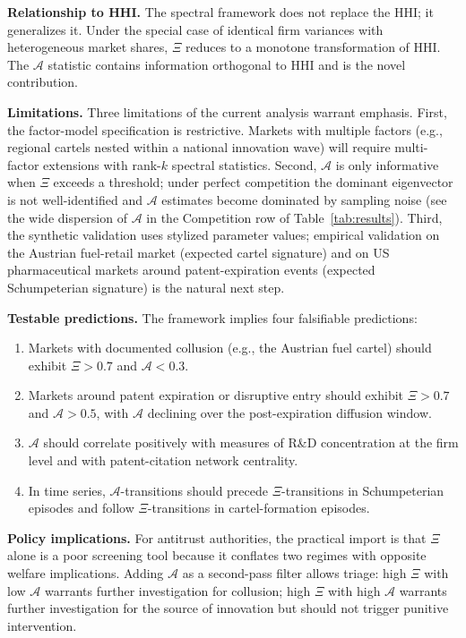 \documentclass[12pt,a4paper]{article}
\newcommand{\SEA}{\mathcal{A}}
\begin{document}
\textbf{Relationship to HHI.} The spectral framework does not replace the HHI; it generalizes it. Under the special case of identical firm variances with heterogeneous market shares, $\Xi$ reduces to a monotone transformation of HHI. The $\SEA$ statistic contains information orthogonal to HHI and is the novel contribution.

\textbf{Limitations.} Three limitations of the current analysis warrant emphasis. First, the factor-model specification is restrictive. Markets with multiple factors (e.g., regional cartels nested within a national innovation wave) will require multi-factor extensions with rank-$k$ spectral statistics. Second, $\SEA$ is only informative when $\Xi$ exceeds a threshold; under perfect competition the dominant eigenvector is not well-identified and $\SEA$ estimates become dominated by sampling noise (see the wide dispersion of $\SEA$ in the Competition row of Table~\ref{tab:results}). Third, the synthetic validation uses stylized parameter values; empirical validation on the Austrian fuel-retail market (expected cartel signature) and on US pharmaceutical markets around patent-expiration events (expected Schumpeterian signature) is the natural next step.

\textbf{Testable predictions.} The framework implies four falsifiable predictions:
\begin{enumerate}[leftmargin=1.6em,itemsep=0pt]
  \item Markets with documented collusion (e.g., the Austrian fuel cartel) should exhibit $\Xi > 0.7$ and $\SEA < 0.3$.
  \item Markets around patent expiration or disruptive entry should exhibit $\Xi > 0.7$ and $\SEA > 0.5$, with $\SEA$ declining over the post-expiration diffusion window.
  \item $\SEA$ should correlate positively with measures of R\&D concentration at the firm level and with patent-citation network centrality.
  \item In time series, $\SEA$-transitions should precede $\Xi$-transitions in Schumpeterian episodes and follow $\Xi$-transitions in cartel-formation episodes.
\end{enumerate}

\textbf{Policy implications.} For antitrust authorities, the practical import is that $\Xi$ alone is a poor screening tool because it conflates two regimes with opposite welfare implications. Adding $\SEA$ as a second-pass filter allows triage: high $\Xi$ with low $\SEA$ warrants further investigation for collusion; high $\Xi$ with high $\SEA$ warrants further investigation for the source of innovation but should not trigger punitive intervention.
\end{document}
